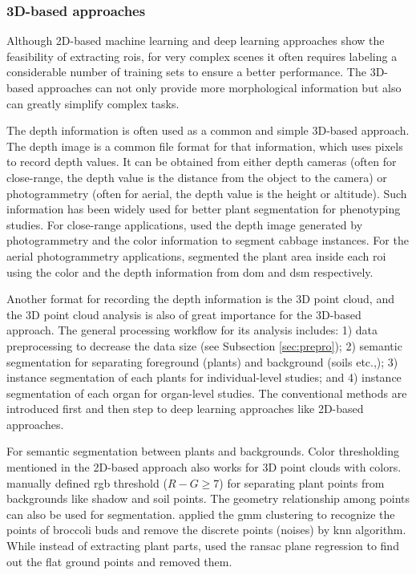 \subsubsection{3D-based approaches}

Although 2D-based machine learning and deep learning approaches show the feasibility of extracting \gls{roi}s, for very complex scenes it often requires labeling a considerable number of training sets to ensure a better performance. The 3D-based approaches can not only provide more morphological information but also can greatly simplify complex tasks.

The depth information is often used as a common and simple 3D-based approach. The depth image is a common file format for that information, which uses pixels to record depth values. It can be obtained from either depth cameras (often for close-range, the depth value is the distance from the object to the camera) or photogrammetry (often for aerial, the depth value is the height or altitude). Such information has been widely used for better plant segmentation for phenotyping studies. For close-range applications, \citep{luling_using_2021} used the depth image generated by photogrammetry and the color information to segment cabbage instances. For the aerial photogrammetry applications, \citet{guo_fieldbased_2020} segmented the plant area inside each \gls{roi} using the color and the depth information from \gls{dom} and \gls{dsm} respectively. 

Another format for recording the depth information is the 3D point cloud, and the 3D point cloud analysis is also of great importance for the 3D-based approach. The general processing workflow for its analysis includes: 1) data preprocessing to decrease the data size (see Subsection \ref{sec:prepro}); 2) semantic segmentation for separating foreground (plants) and background (soils etc.,); 3) instance segmentation of each plants for individual-level studies; and 4) instance segmentation of each organ for organ-level studies. The conventional methods are introduced first and then step to deep learning approaches like 2D-based approaches.

For semantic segmentation between plants and backgrounds. Color thresholding mentioned in the 2D-based approach also works for 3D point clouds with colors. \citet[Fig.~3]{xiao_image-based_2020} manually defined \gls{rgb} threshold ($R-G\geq7$) for separating plant points from backgrounds like shadow and soil points. The geometry relationship among points can also be used for segmentation. \citet{ge_method_2019} applied the \gls{gmm} clustering to recognize the points of broccoli buds and remove the discrete points (noises) by \gls{knn} algorithm. While instead of extracting plant parts, \citet{garrido_3d_2015} used the \gls{ransac} plane regression to find out the flat ground points and removed them.

